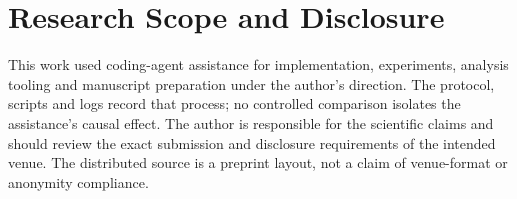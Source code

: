 \section{Research Scope and Disclosure}
This work used coding-agent assistance for implementation, experiments,
analysis tooling and manuscript preparation under the author's direction.
The protocol, scripts and logs record that process; no controlled comparison
isolates the assistance's causal effect. The author is responsible for the
scientific claims and should review the exact submission and disclosure
requirements of the intended venue. The distributed source is a preprint
layout, not a claim of venue-format or anonymity compliance.
